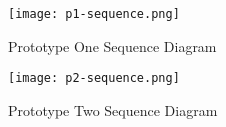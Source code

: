 \begin{figure}[h!]
    \centering
    \texttt{[image: p1-sequence.png]}
    \caption{Prototype One Sequence Diagram}
    \label{fig:p1-sequence}
\end{figure}

\begin{figure}[h!]
    \centering
    \texttt{[image: p2-sequence.png]}
    \caption{Prototype Two Sequence Diagram}
    \label{fig:p2-sequence}
\end{figure}

